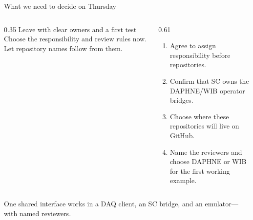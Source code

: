 \documentclass[aspectratio=169,11pt]{beamer}
\begin{document}
\begin{frame}{What we need to decide on Thursday}
  \begin{columns}[T,onlytextwidth]
    \begin{column}{0.35\textwidth}
        {Leave with clear owners and a first test}
        {Choose the responsibility and review rules now. Let repository names follow from them.}
    \end{column}
    \begin{column}{0.61\textwidth}
      \begin{enumerate}
        \DuneTightList
        \item Agree to assign responsibility before repositories.
        \item Confirm that SC owns the DAPHNE/WIB operator bridges.
        \item Choose where these repositories will live on GitHub.
        \item Name the reviewers and choose DAPHNE or WIB for the first working example.
      \end{enumerate}
    \end{column}
  \end{columns}

  \smallskip
    {One shared interface works in a DAQ client, an SC bridge, and an emulator—with named reviewers.}
\end{frame}
\end{document}
